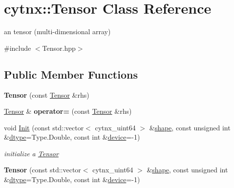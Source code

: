\hypertarget{classcytnx_1_1Tensor}{}\section{cytnx\+:\+:Tensor Class Reference}
\label{classcytnx_1_1Tensor}


an tensor (multi-\/dimensional array)  




{\ttfamily \#include $<$Tensor.\+hpp$>$}

\subsection*{Public Member Functions}
\begin{DoxyCompactItemize}
\item 
\mbox{\label{classcytnx_1_1Tensor_a22124cada82e6dded5978fcf731bfcc5}} 
{\bfseries Tensor} (const \hyperlink{classcytnx_1_1Tensor}{Tensor} \&rhs)
\item 
\mbox{\label{classcytnx_1_1Tensor_a122d879973b24d961a888d615e7e2673}} 
\hyperlink{classcytnx_1_1Tensor}{Tensor} \& {\bfseries operator=} (const \hyperlink{classcytnx_1_1Tensor}{Tensor} \&rhs)
\item 
void \hyperlink{classcytnx_1_1Tensor_afdb4470e0dc934964d80aa9c761cca48}{Init} (const std\+::vector$<$ cytnx\+\_\+uint64 $>$ \&\hyperlink{classcytnx_1_1Tensor_a6d0ab6d09633ad4d6099aa822ec5335a}{shape}, const unsigned int \&\hyperlink{classcytnx_1_1Tensor_a4472af6f8e825a13440e832bf82fb627}{dtype}=Type.\+Double, const int \&\hyperlink{classcytnx_1_1Tensor_ac6d3310eb4defbdacf662dcd81d8fe09}{device}=-\/1)
\begin{DoxyCompactList}\small\item\em initialize a \hyperlink{classcytnx_1_1Tensor}{Tensor} \end{DoxyCompactList}\item 
\mbox{\label{classcytnx_1_1Tensor_afdcff16b2096d10b524161be52ba767e}} 
{\bfseries Tensor} (const std\+::vector$<$ cytnx\+\_\+uint64 $>$ \&\hyperlink{classcytnx_1_1Tensor_a6d0ab6d09633ad4d6099aa822ec5335a}{shape}, const unsigned int \&\hyperlink{classcytnx_1_1Tensor_a4472af6f8e825a13440e832bf82fb627}{dtype}=Type.\+Double, const int \&\hyperlink{classcytnx_1_1Tensor_ac6d3310eb4defbdacf662dcd81d8fe09}{device}=-\/1)

\end{DoxyCompactItemize}
